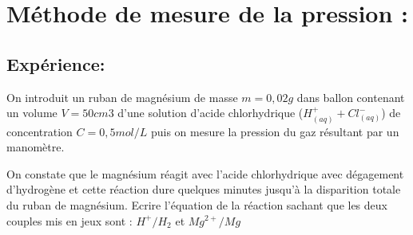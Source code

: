 \documentclass[12pt]{article}
\begin{document}
\section{Méthode de mesure de la pression : }
\subsection{Expérience: }
On introduit un ruban de magnésium de masse $m=0,02g$ dans ballon contenant un volume $V=50cm3$
d'une solution d'acide chlorhydrique ($H^+_{(aq)} + Cl^-_{(aq)}$) de concentration $C=0,5mol/L$ puis on mesure la pression du gaz résultant par un manomètre.

\vspace{0.2cm}

On constate que le magnésium réagit avec l'acide chlorhydrique avec dégagement d'hydrogène et cette réaction dure quelques
minutes jusqu'à la disparition totale du ruban de magnésium.
Ecrire l'équation de la réaction sachant que les deux couples mis en jeux sont : $H^+/H_2$ et $Mg^{2+}/Mg$


\end{document}
